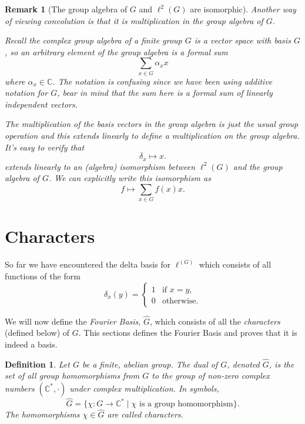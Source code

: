 \documentclass[12pt]{article}
\newtheorem{Definition}{Definition}
\newtheorem{Remark}{Remark}
\newcommand{\C}{\mathbb{C}}
\begin{document}
\begin{Remark}[The group algebra of $G$ and $\ell^2(G)$ are isomorphic]


    Another way of viewing convolution is that it is multiplication in the group algebra of $G$.

    Recall the complex group algebra of a finite group $G$ is a vector space with basis $G$, so an arbitrary element of the group algebra is a formal sum
    \[
        \sum_{x\in G} \alpha_x x
    \]
    where $\alpha_x\in \C$.
    The notation is confusing since we have been using additive notation for $G$, bear in mind that the sum here is a formal sum of linearly independent vectors.

    The multiplication of the basis vectors in the group algebra is just the usual group operation and this extends linearly to define a multiplication on the group algebra.
    It's easy to verify that
    \[
        \delta_x \mapsto x.
    \]
    extends linearly to an (algebra) isomorphism between $\ell^2(G)$ and the group algebra of $G$.
    We can explicitly write this isomorphism as
    \[
        f \mapsto \sum_{x\in G} f(x)x.
    \]
\end{Remark}





\section{Characters}

So far we have encountered the delta basis for $\ell^(G)$ which consists of all functions of the form
\[
    \delta_x(y) =
    \begin{cases}
        1 & \text{if } x = y, \\
        0 & \text{otherwise}.
    \end{cases}
\]

We will now define the \emph{Fourier Basis}, $\widehat{G}$, which consists of all the \emph{characters} (defined below) of $G$.
This sections defines the Fourier Basis and proves that it is indeed a basis.

\begin{Definition} \label{dual group} %
    Let $G$ be a finite, abelian group.
    The dual of $G$, denoted $\widehat{G}$, is the set of all group homomorphisms from $G$ to the group of non-zero complex numbers $(\C^*, \cdot) $ under complex multiplication.
    In symbols,
    \[
        \widehat{G}=\{\chi :G\to \C^*\mid \chi \text{ is a group homomorphism}\}.
    \]
    The homomorphisms $\chi \in \widehat{G}$ are called characters.
\end{Definition}
\end{document}
